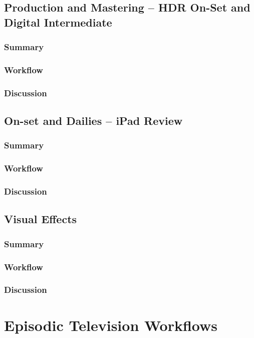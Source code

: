 \subsection{Production and Mastering -- HDR On-Set and Digital Intermediate}
\subsubsection{Summary}
\subsubsection{Workflow}
\subsubsection{Discussion}

\subsection{On-set and Dailies -- iPad Review}
\subsubsection{Summary}
\subsubsection{Workflow}
\subsubsection{Discussion}

\subsection{Visual Effects}
\subsubsection{Summary}
\subsubsection{Workflow}
\subsubsection{Discussion}


\section{Episodic Television Workflows}

